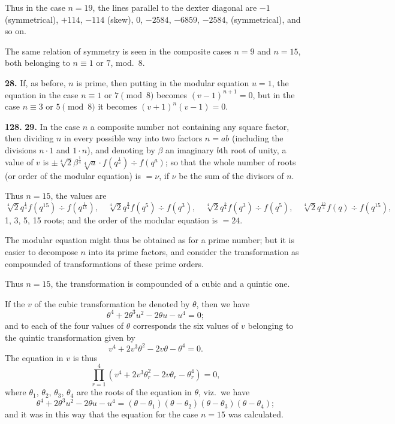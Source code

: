 \documentclass[11pt,a4paper]{article}
\theoremstyle{plain}
\begin{document}
Thus in the case $n = 19$, the lines parallel to the dexter diagonal are $-1$ (symmetrical), $+114$, $-114$ (skew), $0$, $-2584$, $-6859$, $-2584$, (symmetrical), and so on.

The same relation of symmetry is seen in the composite cases $n = 9$ and $n = 15$, both belonging to $n \equiv 1$ or $7$, mod.~8.

\medskip
\noindent\textbf{28.} If, as before, $n$ is prime, then putting in the modular equation $u = 1$, the equation in the case $n \equiv 1$ or $7 \pmod{8}$ becomes $(v - 1)^{n+1} = 0$, but in the case $n \equiv 3$ or $5 \pmod{8}$ it becomes $(v + 1)^n(v - 1) = 0$.


\noindent\textbf{128.} \textbf{29.} In the case $n$ a composite number not containing any square factor, then dividing $n$ in every possible way into two factors $n = ab$ (including the divisions $n \cdot 1$ and $1 \cdot n$), and denoting by $\beta$ an imaginary $b$th root of unity, a value of $v$ is $\pm\sqrt[4]{2}\beta^{\frac{1}{4}}\sqrt[4]{a} \cdot f(q^{\frac{1}{a}}) \div f(q^a)$; so that the whole number of roots (or order of the modular equation) is $= \nu$, if $\nu$ be the sum of the divisors of $n$.

Thus $n = 15$, the values are
\[
\sqrt[4]{2}q^{\frac{1}{4}}f(q^{15}) \div f(q^{\frac{1}{15}}), \quad
\sqrt[4]{2}q^{\frac{3}{4}}f(q^5) \div f(q^3), \quad
\sqrt[4]{2}q^{\frac{5}{4}}f(q^3) \div f(q^5), \quad
\sqrt[4]{2}q^{\frac{15}{4}}f(q) \div f(q^{15}),
\]
1, 3, 5, 15 roots; and the order of the modular equation is $= 24$.

The modular equation might thus be obtained as for a prime number; but it is easier to decompose $n$ into its prime factors, and consider the transformation as compounded of transformations of these prime orders.

Thus $n = 15$, the transformation is compounded of a cubic and a quintic one.

If the $v$ of the cubic transformation be denoted by $\theta$, then we have
\[
\theta^4 + 2\theta^3u^2 - 2\theta u - u^4 = 0;
\]
and to each of the four values of $\theta$ corresponds the six values of $v$ belonging to the quintic transformation given by
\[
v^4 + 2v^3\theta^2 - 2v\theta - \theta^4 = 0.
\]
The equation in $v$ is thus
\[
\prod_{r=1}^{4}(v^4 + 2v^3\theta_r^2 - 2v\theta_r - \theta_r^4) = 0,
\]
where $\theta_1$, $\theta_2$, $\theta_3$, $\theta_4$ are the roots of the equation in $\theta$, viz.\ we have
\[
\theta^4 + 2\theta^3u^2 - 2\theta u - u^4 = (\theta - \theta_1)(\theta - \theta_2)(\theta - \theta_3)(\theta - \theta_4);
\]
and it was in this way that the equation for the case $n = 15$ was calculated.
\end{document}
